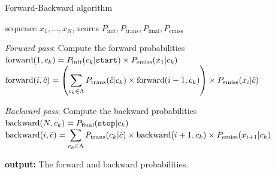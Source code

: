 \begin{algorithm}[t]
   \caption{Forward-Backward algorithm \label{alg:fb}}
\begin{algorithmic}[1]
    sequence $x_1,\ldots,x_N$, scores $P_{\mathrm{init}}, P_{\mathrm{trans}}, P_{\mathrm{final}}, P_{\mathrm{emiss}}$
        \item[]
        \STATE  \emph{Forward pass}: Compute the forward probabilities
        \STATE $\mathrm{forward}(1,c_k) = P_{\mathrm{init}}(c_k|\text{\tt start}) \times 
P_{\mathrm{emiss}}(x_1 | c_k)$
        \ENDFOR 
                 \STATE $\mathrm{forward}(i, \hat{c} ) = \left( \displaystyle \sum_{c_k \in \Lambda} P_{\mathrm{trans}}(\hat{c}| c_k) \times \mathrm{forward}(i-1, c_k) \right) \times P_{\mathrm{emiss}}(x_i | \hat{c})$
         \ENDFOR 
        \ENDFOR 
       \item[]
       \STATE \emph{Backward pass}: Compute the backward probabilities
        \STATE $\mathrm{backward}(N, c_k) = P_{\mathrm{final}}(\text{\tt stop} | c_k)$
        \ENDFOR 
       \STATE $\mathrm{backward}(i, \hat{c}) =  \displaystyle \sum_{c_k \in \Lambda} P_{\mathrm{trans}}(c_k | \hat{c} ) \times \mathrm{backward}(i+1, c_k) \times P_{\mathrm{emiss}}(x_{i+1} | c_k)$
       	 \ENDFOR 
        \ENDFOR 
        \item[]
       \STATE \textbf{output:} The forward and backward probabilities.
\end{algorithmic}
\end{algorithm}




